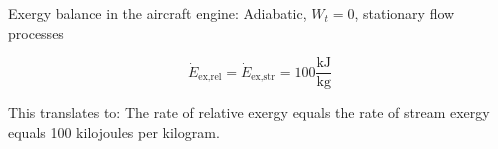 Exergy balance in the aircraft engine: Adiabatic, \( W_t = 0 \), stationary flow processes

\[
\dot{E}_{\text{ex,rel}} = \dot{E}_{\text{ex,str}} = 100 \frac{\text{kJ}}{\text{kg}}
\]

This translates to: The rate of relative exergy equals the rate of stream exergy equals 100 kilojoules per kilogram.